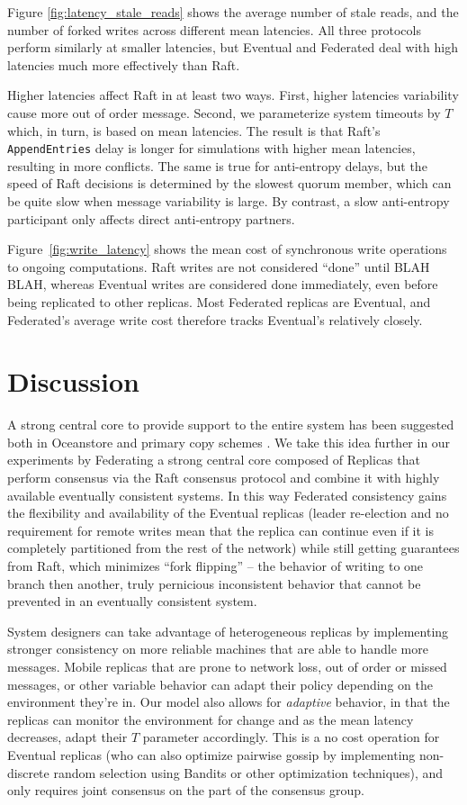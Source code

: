 \documentclass[10pt,conference,letterpaper]{IEEEtran}
\begin{document}
Figure \ref{fig:latency_stale_reads} shows the average number of stale reads, and the
number of forked writes across different mean latencies.
All three protocols perform similarly at smaller latencies, but Eventual and
Federated deal with high latencies much more effectively than Raft.

Higher latencies affect Raft in at least two ways. First, higher latencies
variability cause more out of order message. Second, we parameterize system
timeouts by $T$ which, in turn, is based on mean latencies.
The result is that Raft's \texttt{AppendEntries} delay is longer for
simulations with higher mean latencies, resulting in more conflicts.
The same is true for anti-entropy delays, but the speed of Raft decisions is
determined by the slowest quorum member, which can be quite slow when message
variability is large. By contrast, a slow anti-entropy participant only
affects direct anti-entropy partners.

Figure~\ref{fig:write_latency} shows the mean cost of synchronous write operations to
ongoing computations. Raft writes are not considered ``done'' until BLAH BLAH,
whereas Eventual writes are considered done immediately, even before being
replicated to other replicas.
Most Federated replicas are Eventual, and Federated's average write cost
therefore tracks Eventual's relatively closely.

\section{Discussion}

A strong central core to provide support to the entire system has been suggested both in Oceanstore \cite{kubiatowicz_oceanstore:_2000} and primary copy schemes \cite{gray_dangers_1996}. We take this idea further in our experiments by Federating a strong central core composed of Replicas that perform consensus via the Raft consensus protocol and combine it with highly available eventually consistent systems. In this way Federated consistency gains the flexibility and availability of the Eventual replicas (leader re-election and no requirement for remote writes mean that the replica can continue even if it is completely partitioned from the rest of the network) while still getting guarantees from Raft, which minimizes ``fork flipping'' -- the behavior of writing to one branch then another, truly pernicious inconsistent behavior that cannot be prevented in an eventually consistent system.

System designers can take advantage of heterogeneous replicas by implementing stronger consistency on more reliable machines that are able to handle more messages. Mobile replicas that are prone to network loss, out of order or missed messages, or other variable behavior can adapt their policy depending on the environment they're in. Our model also allows for \textit{adaptive} behavior, in that the replicas can monitor the environment for change and as the mean latency decreases, adapt their $T$ parameter accordingly. This is a no cost operation for Eventual replicas (who can also optimize pairwise gossip by implementing non-discrete random selection using Bandits or other optimization techniques), and only requires joint consensus on the part of the consensus group.
\end{document}
